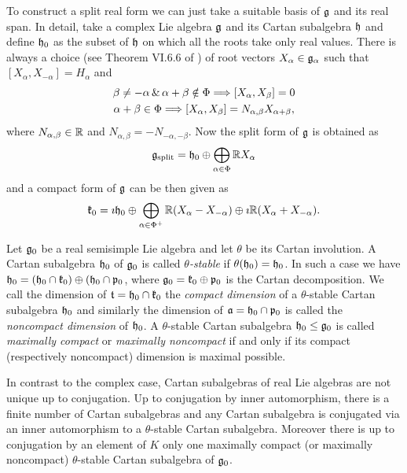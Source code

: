 To construct a split real form we can just take a suitable basis of $\mathfrak{g}$ and its real span. In detail, take a complex Lie algebra $\mathfrak{g}$ and its Cartan subalgebra $\mathfrak{h}$ and define $\mathfrak{h}_0$ as the subset of $\mathfrak{h}$ on which all the roots take only real values. There is always a choice (see Theorem VI.6.6 of \cite{knapp_lie_1996}) of root vectors $X_\alpha \in \mathfrak{g}_\alpha$ such that $[X_\alpha, X_{-\alpha}] = H_\alpha$ and
\begin{gather*}
\beta \neq -\alpha \,\&\, \alpha + \beta \notin \Phi \Longrightarrow [X_\alpha,X_\beta]=0 \\
 \alpha + \beta \in\Phi \Longrightarrow [X_\alpha, X_\beta] = N_{\alpha,\beta}X_{\alpha+\beta},
\end{gather*}
where $N_{\alpha,\beta}\in\mathbb{R}$ and $N_{\alpha,\beta} = -N_{-\alpha,-\beta}$. Now the split form of $\mathfrak{g}$ is obtained as
\[
 \mathfrak{g}_\text{split} = \mathfrak{h}_0 \oplus \bigoplus_{\alpha \in\Phi} \mathbb{R} X_\alpha
\]
and a compact form of $\mathfrak{g}$ can be then given as
\[
 \mathfrak{k}_0 = \imath \mathfrak{h}_0 \oplus \bigoplus_{\alpha\in\Phi^+} \mathbb{R} (X_\alpha - X_{-\alpha}) \oplus \imath \mathbb{R} (X_\alpha + X_{-\alpha}).
\]

Let $\mathfrak{g}_0$ be a real semisimple Lie algebra and let $\theta$ be its Cartan involution. A Cartan subalgebra $\mathfrak{h}_0$ of $\mathfrak{g}_0$ is called \emph{$\theta$-stable} if $\theta(\mathfrak{h}_0)=\mathfrak{h}_0$. In such a case we have $\mathfrak{h}_0= (\mathfrak{h}_0\cap\mathfrak{k}_0) \oplus (\mathfrak{h}_0\cap\mathfrak{p}_0$, where $\mathfrak{g}_0 = \mathfrak{k}_0\oplus\mathfrak{p}_0$ is the Cartan decomposition. We call the dimension of $\mathfrak{t} = \mathfrak{h}_0\cap\mathfrak{k}_0$ the \emph{compact dimension} of a $\theta$-stable  Cartan subalgebra $\mathfrak{h}_0$ and similarly the dimension of $\mathfrak{a} = \mathfrak{h}_0\cap\mathfrak{p}_0$ is called the \emph{noncompact dimension} of $\mathfrak{h}_0$. A $\theta$-stable Cartan subalgebra $\mathfrak{h}_0 \leq \mathfrak{g}_0$ is called \emph{maximally compact} or \emph{maximally noncompact} if and only if its compact (respectively noncompact) dimension is maximal possible.


In contrast to the complex case, Cartan subalgebras of real Lie algebras are not unique up to conjugation. Up to conjugation by inner automorphism, there is a finite number of Cartan subalgebras and any Cartan subalgebra is conjugated via an inner automorphism to a $\theta$-stable Cartan subalgebra. Moreover there is up to conjugation by an element of $K$ only one maximally compact (or maximally noncompact) $\theta$-stable Cartan subalgebra of $\mathfrak{g}_0$.

